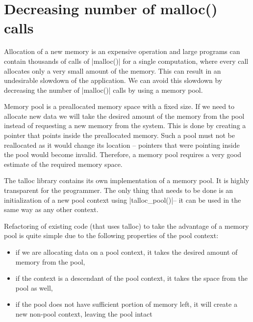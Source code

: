 \section{Decreasing number of malloc() calls}
\label{talloc:pool}

Allocation of a new memory is an expensive operation and large programs can
contain thousands of calls of |malloc()| for a single computation, where every
call allocates only a very small amount of the memory. This can result in an
undesirable slowdown of the application. We can avoid this slowdown by
decreasing the number of |malloc()| calls by using a memory pool.

Memory pool is a preallocated memory space with a fixed size. If we need to
allocate new data we will take the desired amount of the memory from the pool
instead of requesting a new memory from the system. This is done by creating a
pointer that points inside the preallocated memory. Such a pool must not be
reallocated as it would change its location -- pointers that were pointing
inside the pool would become invalid. Therefore, a memory pool requires a very
good estimate of the required memory space.

The talloc library contains its own implementation of a memory pool. It is
highly transparent for the programmer. The only thing that needs to be done is
an initialization of a new pool context using |talloc_pool()|\footnotemark --
it can be used in the same way as any other context.


Refactoring of existing code (that uses talloc) to take the advantage of a
memory pool is quite simple due to the following properties of the pool context:

\begin{itemize}
  \item if we are allocating data on a pool context, it takes the desired
  amount of memory from the pool,
  \item if the context is a descendant of the pool context, it takes the space
  from the pool as well,
  \item if the pool does not have sufficient portion of memory left, it will
  create a new non-pool context, leaving the pool intact
\end{itemize}


